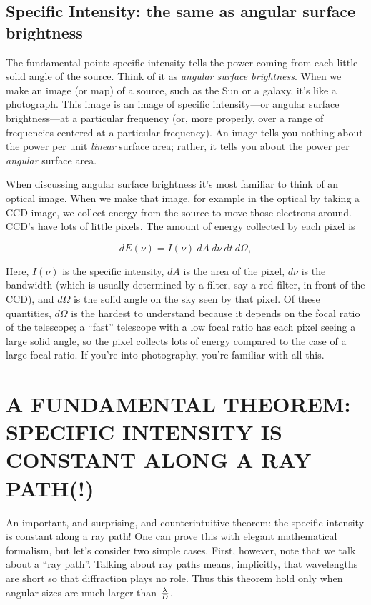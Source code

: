 \documentclass[psfig,preprint]{aastex}
\begin{document}
\subsection{Specific Intensity: the same as  angular surface brightness}

	The fundamental point: specific intensity tells the power coming
from each little solid angle of the source. Think of it as {\it  angular
surface brightness}. When we make an image (or map) of a source, such as
the Sun or a galaxy, it's like a photograph. This image is an image of
specific intensity---or  angular surface brightness---at a particular
frequency (or, more properly, over a range of frequencies centered at a
particular frequency). An image tells you nothing about the power per
unit {\it linear} surface area; rather, it tells you about the power per {\it
angular} surface area. 

	When discussing  angular surface brightness it's most familiar
to think of an optical image. When we make that image, for example in
the optical by taking a CCD image, we collect energy from the source to
move those electrons around. CCD's have lots of little pixels. The
amount of energy collected by each pixel is

\begin{equation} \label{efromi}
 dE(\nu) = I(\nu)~dA~d\nu~dt~d\Omega,
\end{equation}

\noindent Here, $I(\nu)$ is the specific intensity, $dA$ is the area of
the pixel, $d\nu$ is the bandwidth (which is usually determined by a
filter, say a red filter, in front of the CCD), and $d\Omega$ is the
solid angle on the sky seen by that pixel. Of these quantities,
$d\Omega$ is the hardest to understand because it depends on the focal
ratio of the telescope; a ``fast'' telescope with a low focal ratio has
each pixel seeing a large solid angle, so the pixel collects lots of
energy compared to the case of a large focal ratio. If you're into
photography, you're familiar with all this.

\section{A FUNDAMENTAL THEOREM: SPECIFIC INTENSITY IS CONSTANT ALONG
A RAY PATH(!)} \label{theorem}

	An important, and surprising, and counterintuitive theorem: the
specific intensity is constant along a ray path! One can prove this with
elegant mathematical formalism, but let's consider two simple cases. 
First, however, note that we talk about a ``ray path''.  Talking about
ray paths means, implicitly, that wavelengths are short so that
diffraction plays no role.  Thus this theorem hold only when angular
sizes are much larger than $\lambda \over D$. 
\end{document}
